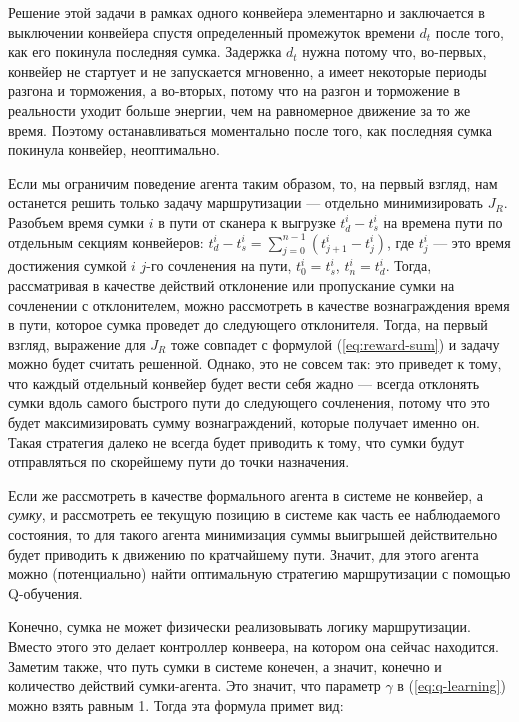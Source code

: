 \documentclass[specification,annotation,times]{itmo-student-thesis}
\theoremstyle{definition}
\begin{document}
Решение этой задачи в рамках одного конвейера элементарно и заключается в
выключении конвейера спустя определенный промежуток времени $d_t$ после того,
как его покинула последняя сумка. Задержка $d_t$ нужна потому что, во-первых,
конвейер не стартует и не запускается мгновенно, а имеет некоторые периоды
разгона и торможения, а во-вторых, потому что на разгон и торможение в
реальности уходит больше энергии, чем на равномерное движение за то же время.
Поэтому останавливаться моментально после того, как последняя сумка покинула
конвейер, неоптимально.

Если мы ограничим поведение агента таким образом, то, на первый взгляд, нам
останется решить только задачу маршрутизации --- отдельно минимизировать $J_R$.
Разобъем время сумки $i$ в пути от сканера к выгрузке $t_d^i - t_s^i$ на времена
пути по отдельным секциям конвейеров:
$t_d^i - t_s^i = \sum\limits_{j=0}^{n-1} (t_{j+1}^i - t_j^i)$, где $t_j^i$ ---
это время достижения сумкой $i$ $j$-го сочленения на пути, $t_0^i = t_s^i$,
$t_n^i = t_d^i$. Тогда, рассматривая в качестве действий отклонение или
пропускание сумки на сочленении с отклонителем, можно рассмотреть в качестве
вознаграждения время в пути, которое сумка проведет до следующего отклонителя.
Тогда, на первый взгляд, выражение для $J_R$ тоже совпадет с формулой
(\ref{eq:reward-sum}) и задачу можно будет считать решенной. Однако, это не
совсем так: это приведет к тому, что каждый отдельный конвейер будет вести себя
жадно --- всегда отклонять сумки вдоль самого быстрого пути до следующего
сочленения, потому что это будет максимизировать сумму вознаграждений, которые
получает именно он. Такая стратегия далеко не всегда будет приводить к тому, что
сумки будут отправляться по скорейшему пути до точки назначения.

Если же рассмотреть в качестве формального агента в системе не
конвейер, а \textit{сумку}, и рассмотреть ее текущую позицию в системе как часть
ее наблюдаемого состояния, то для такого агента минимизация суммы выигрышей
действительно будет приводить к движению по кратчайшему пути. Значит, для этого
агента можно (потенциально) найти оптимальную стратегию маршрутизации с помощью
Q-обучения.

Конечно, сумка не может физически реализовывать логику маршрутизации. Вместо
этого это делает контроллер конвеера, на котором она сейчас находится.
Заметим также, что путь сумки в системе конечен, а значит, конечно и
количество действий сумки-агента. Это значит, что параметр $\gamma$ в
(\ref{eq:q-learning}) можно взять равным 1. Тогда эта формула примет вид:
\end{document}
